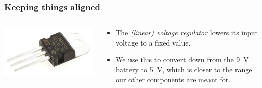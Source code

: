 \documentclass{beamer}
\begin{document}
\begin{frame}
  \frametitle{Keeping things aligned}
  \begin{columns}
    \begin{column}{0.5\textwidth}
      \includegraphics[width=\textwidth]{res/lvr.jpg}
    \end{column}
    \begin{column}{0.5\textwidth}
      \begin{itemize}
        \item
          The \emph{(linear) voltage regulator} lowers its input voltage to a
          fixed value.
        \item
          We use this to convert down from the 9~V battery to 5~V, which is
          closer to the range our other components are meant for.
      \end{itemize}
    \end{column}
  \end{columns}
\end{frame}
\end{document}
